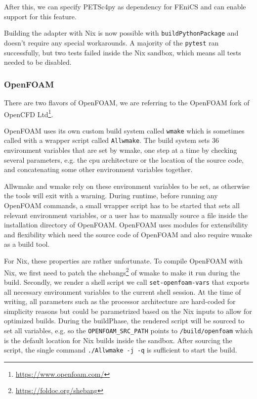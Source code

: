 \documentclass{eceasst}
\begin{document}
After this, we can specify PETSc4py as dependency for FEniCS and can enable support for this feature.

Building the adapter with Nix is now possible with \texttt{buildPythonPackage} and doesn't require any special workarounds.
A majority of the \texttt{pytest} ran successfully, but two tests failed inside the Nix sandbox, which means all tests needed to be disabled.\\

\subsubsection{OpenFOAM}

There are two flavors of OpenFOAM, we are referring to the OpenFOAM fork of OpenCFD Ltd\footnote{\url{https://www.openfoam.com/}}.

OpenFOAM uses its own custom build system called \texttt{wmake} which is sometimes called with a wrapper script called \texttt{Allwmake}.
The build system sets 36 environment variables that are set by wmake, one step at a time by checking several parameters, e.g. the cpu architecture or the location of the source code, and concatenating some other environment variables together.

Allwmake and wmake rely on these environment variables to be set, as otherwise the tools will exit with a warning.
During runtime, before running any OpenFOAM commands, a small wrapper script has to be started that sets all relevant environment variables, or a user has to manually source a file inside the installation directory of OpenFOAM.
OpenFOAM uses modules for extensibility and flexibility which need the source code of OpenFOAM and also require wmake as a build tool.

For Nix, these properties are rather unfortunate.
To compile OpenFOAM with Nix, we first need to patch the shebangs\footnote{\url{https://foldoc.org/shebang}} of wmake to make it run during the build.
Secondly, we render a shell script we call \texttt{set-openfoam-vars} that exports all necessary environment variables to the current shell session.
At the time of writing, all parameters such as the processor architecture are hard-coded for simplicity reasons but could be parametrized based on the Nix inputs to allow for optimized builds.
During the buildPhase, the rendered script will be sourced to set all variables, e.g. so the \texttt{OPENFOAM\_SRC\_PATH} points to \texttt{/build/openfoam} which is the default location for Nix builds inside the sandbox.
After sourcing the script, the single command \texttt{./Allwmake -j -q} is sufficient to start the build.
\end{document}

